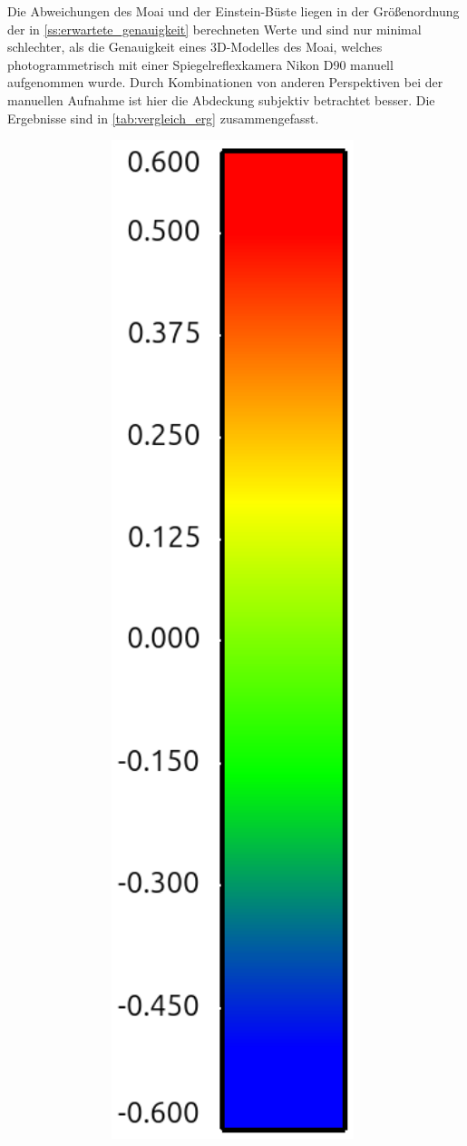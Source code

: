 \documentclass[./00PhotoBox.tex]{subfiles}
\begin{document}
Die Abweichungen des Moai und der Einstein-Büste liegen in der Größenordnung der in \autoref{ss:erwartete_genauigkeit} berechneten Werte und sind nur minimal schlechter, als die Genauigkeit eines 3D-Modelles des Moai, welches photogrammetrisch mit einer Spiegelreflexkamera Nikon D90 manuell aufgenommen wurde. Durch Kombinationen von anderen Perspektiven bei der manuellen Aufnahme ist hier die Abdeckung subjektiv betrachtet besser. Die Ergebnisse sind in \autoref{tab:vergleich_erg} zusammengefasst.

\begin{figure}
    \centering
    \begin{subfigure}{0.11\textwidth}
        \includegraphics[width=0.98\textwidth]{img/cam_anzahl/scala.png}


\end{subfigure}
\end{figure}
\end{document}
